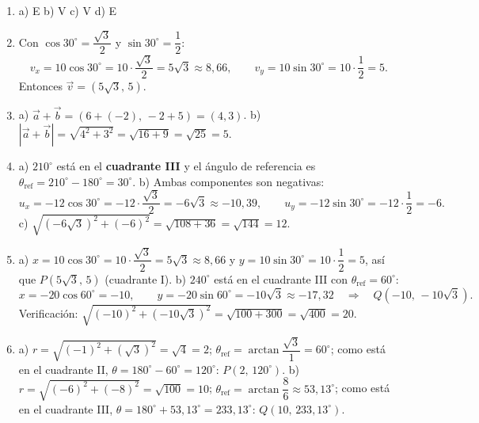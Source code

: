 \documentclass[12pt, letterpaper]{article}
\providecommand{\sen}{\sin}
\begin{document}
  \begin{enumerate}[leftmargin=*, label=\textbf{\arabic*.}]
    \item a) E \quad b) V \quad c) V \quad d) E

    \item Con $\cos 30^{\circ} = \dfrac{\sqrt{3}}{2}$ y $\sen 30^{\circ} = \dfrac{1}{2}$:
          \[
            v_x = 10\cos 30^{\circ} = 10 \cdot \frac{\sqrt{3}}{2} = 5\sqrt{3} \approx 8{,}66, \qquad
            v_y = 10\sen 30^{\circ} = 10 \cdot \frac{1}{2} = 5.
          \]
          Entonces $\vec{v} = (5\sqrt{3},\, 5)$.

    \item a) $\vec{a} + \vec{b} = (6 + (-2),\, -2 + 5) = (4, 3)$.
          \quad b) $|\vec{a} + \vec{b}| = \sqrt{4^2 + 3^2} = \sqrt{16 + 9} = \sqrt{25} = 5$.

    \item a) $210^{\circ}$ está en el \textbf{cuadrante III} y el ángulo de referencia es $\theta_{\text{ref}} = 210^{\circ} - 180^{\circ} = 30^{\circ}$.
          \quad b) Ambas componentes son negativas:
          \[
            u_x = -12\cos 30^{\circ} = -12 \cdot \frac{\sqrt{3}}{2} = -6\sqrt{3} \approx -10{,}39, \qquad
            u_y = -12\sen 30^{\circ} = -12 \cdot \frac{1}{2} = -6.
          \]
          \quad c) $\sqrt{(-6\sqrt{3})^2 + (-6)^2} = \sqrt{108 + 36} = \sqrt{144} = 12$. \ \checkmark

    \item a) $x = 10\cos 30^{\circ} = 10 \cdot \dfrac{\sqrt{3}}{2} = 5\sqrt{3} \approx 8{,}66$ y $y = 10\sen 30^{\circ} = 10 \cdot \dfrac{1}{2} = 5$, así que $P(5\sqrt{3},\, 5)$ (cuadrante I).
          \quad b) $240^{\circ}$ está en el cuadrante III con $\theta_{\text{ref}} = 60^{\circ}$:
          \[
            x = -20\cos 60^{\circ} = -10, \qquad y = -20\sen 60^{\circ} = -10\sqrt{3} \approx -17{,}32 \quad \Rightarrow \quad Q(-10,\, -10\sqrt{3}).
          \]
          Verificación: $\sqrt{(-10)^2 + (-10\sqrt{3})^2} = \sqrt{100 + 300} = \sqrt{400} = 20$. \ \checkmark

    \item a) $r = \sqrt{(-1)^2 + (\sqrt{3})^2} = \sqrt{4} = 2$; $\theta_{\text{ref}} = \arctan\dfrac{\sqrt{3}}{1} = 60^{\circ}$; como está en el cuadrante II, $\theta = 180^{\circ} - 60^{\circ} = 120^{\circ}$: $P(2,\, 120^{\circ})$.
          \quad b) $r = \sqrt{(-6)^2 + (-8)^2} = \sqrt{100} = 10$; $\theta_{\text{ref}} = \arctan\dfrac{8}{6} \approx 53{,}13^{\circ}$; como está en el cuadrante III, $\theta = 180^{\circ} + 53{,}13^{\circ} = 233{,}13^{\circ}$: $Q(10,\, 233{,}13^{\circ})$.
  \end{enumerate}
\end{document}
